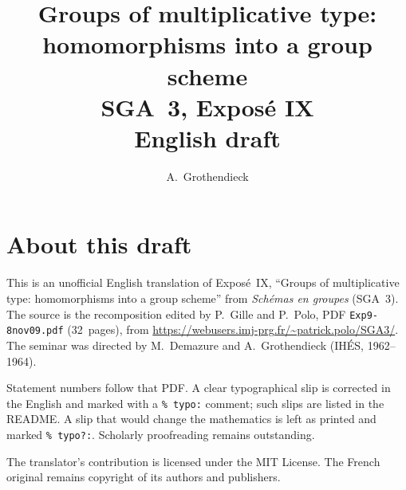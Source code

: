 \documentclass[11pt,a4paper,oneside]{amsbook}
\title[SGA~3, Expos\'e IX (English draft)]{Groups of multiplicative type: homomorphisms into a group scheme\\
{\normalsize SGA~3, Expos\'e IX\\English draft}}
\author{A.\ Grothendieck}
\date{}
\begin{document}
\frontmatter
\maketitle

\chapter*{About this draft}
This is an unofficial English translation of Expos\'e~IX, ``Groups of multiplicative type: homomorphisms into a group scheme''
from \textit{Sch\'emas en groupes} (SGA~3).
The source is the recomposition edited by P.~Gille and P.~Polo,
PDF \texttt{Exp9-8nov09.pdf} (32~pages),
from \url{https://webusers.imj-prg.fr/~patrick.polo/SGA3/}.
The seminar was directed by M.~Demazure and A.~Grothendieck
(IH\'ES, 1962--1964).

Statement numbers follow that PDF. A clear typographical slip is
corrected in the English and marked with a \texttt{\% typo:} comment;
such slips are listed in the README. A slip that would change the
mathematics is left as printed and marked \texttt{\% typo?:}.
Scholarly proofreading remains outstanding.

The translator's contribution is licensed under the MIT License.
The French original remains copyright of its authors and publishers.

\tableofcontents
\mainmatter





\end{document}
